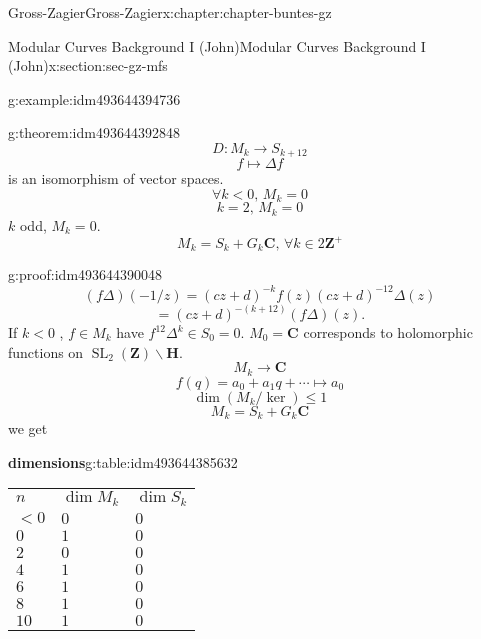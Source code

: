 \documentclass[oneside,10pt,]{book}
\numberwithin{equation}{section}
\newcommand{\ZZ}{\mathbf{Z}}
\newcommand{\CC}{\mathbf{C}}
\newcommand{\HH}{\mathbf{H}}
\DeclareMathOperator{\SL}{SL}
\newcommand{\lt}{<}
\begin{document}
\begin{chapterptx}{Gross-Zagier}{}{Gross-Zagier}{}{}{x:chapter:chapter-buntes-gz}
\begin{sectionptx}{Modular Curves Background I (John)}{}{Modular Curves Background I (John)}{}{}{x:section:sec-gz-mfs}
\begin{example}{}{g:example:idm493644394736}
\end{example}
\begin{theorem}{}{}{g:theorem:idm493644392848}%
%
\begin{equation*}
D\colon M_k \to S_{k+12}
\end{equation*}
%
\begin{equation*}
f\mapsto \Delta f
\end{equation*}
is an isomorphism of vector spaces.%
\begin{equation*}
\forall k \lt  0,\, M_k = 0
\end{equation*}
%
\begin{equation*}
k=2,\, M_k = 0
\end{equation*}
\(k\) odd, \(M_k = 0\).%
\begin{equation*}
M_k = S_k + G_k \CC,\,\forall k \in 2\ZZ^+
\end{equation*}
%
\end{theorem}
\begin{proofptx}{}{g:proof:idm493644390048}
%
\begin{equation*}
(f\Delta) (-1/z) = (cz+d)^{-k}f(z) (cz+d)^{-12} \Delta (z)
\end{equation*}
%
\begin{equation*}
= (cz+d)^{-(k+12)}(f\Delta ) (z)\text{.}
\end{equation*}
If \(k \lt  0\) , \(f \in M_k\) have \(f^{12}\Delta ^k \in S_0 = 0\). \(M_0 =\CC\) corresponds to holomorphic functions on \(\SL_2(\ZZ) \backslash \HH\).%
\begin{equation*}
M_k \to \CC
\end{equation*}
%
\begin{equation*}
f(q) = a_0  + a_1 q + \cdots \mapsto a_0
\end{equation*}
%
\begin{equation*}
\dim(M_k / \ker) \le 1
\end{equation*}
%
\begin{equation*}
M_k = S_k + G_k \CC
\end{equation*}
we get%
\begin{tableptx}{\textbf{dimensions}}{g:table:idm493644385632}{}%
\centering
\begin{tabular}{lll}
\(n\)&\(\dim M_k\)&\(\dim S_k\)\tabularnewline[0pt]
\(\lt 0\)&\(0\)&\(0\)\tabularnewline[0pt]
\(0\)&\(1\)&\(0\)\tabularnewline[0pt]
\(2\)&\(0\)&\(0\)\tabularnewline[0pt]
\(4\)&\(1\)&\(0\)\tabularnewline[0pt]
\(6\)&\(1\)&\(0\)\tabularnewline[0pt]
\(8\)&\(1\)&\(0\)\tabularnewline[0pt]
\(10\)&\(1\)&\(0\)\tabularnewline[0pt]

\end{tabular}
\end{tableptx}
\end{proofptx}
\end{sectionptx}
\end{chapterptx}
\end{document}
